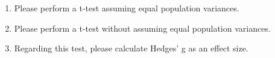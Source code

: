 \begin{enumerate}
	\item Please perform a t-test assuming equal population variances.
	\item Please perform a t-test without assuming equal population variances.
	\item Regarding this test, please calculate Hedges' g as an effect size.
\end{enumerate}

